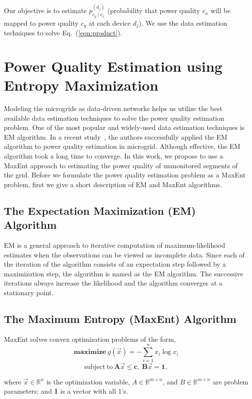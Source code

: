 Our objective is to estimate $p_{c_y \mid c_x}^{(d_j)}$ (probability that power quality $c_x$ will be mapped to power quality $c_y$ at each device $d_j$). We use the data estimation techniques to solve Eq.~(\ref{eqn:product}).

\vspace{0.5cm}
\section{Power Quality Estimation using Entropy Maximization}
\label{sec:formulation}
Modeling the microgrids as data-driven networks helps us utilize the best available data estimation techniques to solve the power quality estimation problem. One of the most popular and widely-used data estimation techniques is EM algorithm. In a recent study~\cite{catherine_pri}, the authors successfully applied the EM algorithm to power quality estimation in microgrid. Although effective, the EM algorithm took a long time to converge. In this work, we propose to use a MaxEnt approach to estimating the power quality of unmonitored segments of the grid. Before we formulate the power quality estimation problem as a MaxEnt problem, first we give a short description of EM and MaxEnt algorithms.

\vspace{0.5cm}
\subsection{The Expectation Maximization (EM) Algorithm} EM is a general approach to iterative computation of maximum-likelihood estimates when the observations can be viewed as incomplete data. Since each of the iteration of the algorithm consists of an expectation step followed by a maximization step, the algorithm is named as the EM algorithm. The successive iterations always increase the likelihood and the algorithm converges at a stationary point.

\vspace{0.5cm}
\subsection{The Maximum Entropy (MaxEnt) Algorithm} MaxEnt solves convex optimization problems of the form,
\[\mathrm{\mathbf{maximize}}~g(\vec{x}) = - \sum_{i=1}^n x_i \log x_i \]
\[\mathrm{subject~to~} \mathbf{A}\vec{x} \leq \mathbf{c},~ \mathbf{B}\vec{x} = \mathbf{1},\]

where $\vec{x}\in \mathbb{R}^n$ is the optimization variable, $A \in \mathbb{R}^{m \times n}$, and $B \in \mathbb{R}^{m \times n}$ are problem parameters;  and \textbf{1} is a vector with all 1's.

